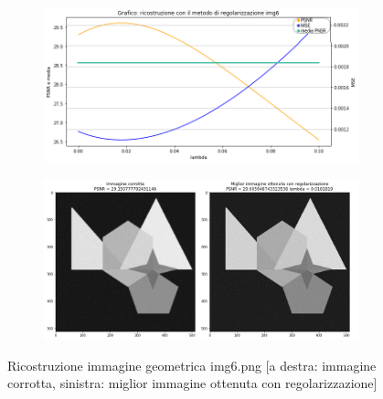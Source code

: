 \begin{figure}[H]
    \begin{subfigure}{0.5\textwidth}
        \includegraphics[width=\textwidth]{imgRicostruzione/grafico6minimize.png}
    \end{subfigure}%
    \begin{subfigure}{0.5\textwidth}
        \centering
        \includegraphics[width=\textwidth]{imgRicostruzione/ricostruzione6minimize.png}
    \end{subfigure}
    \caption{Ricostruzione immagine geometrica img6.png [a destra: immagine corrotta, sinistra: miglior immagine ottenuta con regolarizzazione]}
    

\end{figure}
